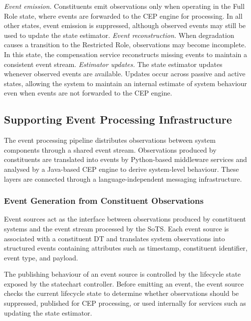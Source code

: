 

\textit{Event emission.} Constituents emit observations only when operating in the Full Role state, where events are forwarded to the CEP engine for processing. In all other states, event emission is suppressed, although observed events may still be used to update the state estimator. \textit{Event reconstruction.} When degradation causes a transition to the Restricted Role, observations may become incomplete. In this state, the compensation service reconstructs missing events to maintain a consistent event stream. \textit{Estimator updates.} The state estimator updates whenever observed events are available. Updates occur across passive and active states, allowing the system to maintain an internal estimate of system behaviour even when events are not forwarded to the CEP engine.


\subsection{Supporting Event Processing Infrastructure}
The event processing pipeline distributes observations between system components through a shared event stream. Observations produced by constituents are translated into events by Python-based middleware services and analysed by a Java-based CEP engine to derive system-level behaviour. These layers are connected through a language-independent messaging infrastructure.


\subsubsection{Event Generation from Constituent Observations}

Event sources act as the interface between observations produced by constituent systems and the event stream processed by the SoTS. Each event source is associated with a constituent DT and translates system observations into structured events containing attributes such as timestamp, constituent identifier, event type, and payload.

The publishing behaviour of an event source is controlled by the lifecycle state exposed by the statechart controller. Before emitting an event, the event source checks the current lifecycle state to determine whether observations should be suppressed, published for CEP processing, or used internally for services such as updating the state estimator.

